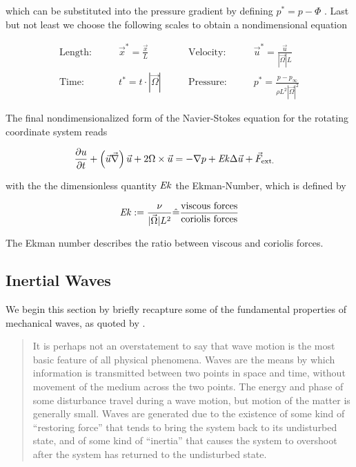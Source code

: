 which can be substituted into the pressure gradient by defining $p^* = p - \Phi$ \citep{tritton88}.
\newpage
Last but not least we choose the following scales to obtain a nondimensional equation

\begin{align}
    \text{Length:}\qquad &  \vec{x}^* = \frac{\vec{x}}{L}  &
    \qquad \text{Velocity:}\qquad& \vec{u}^* =  \frac{\vec{u}}{|\vec{\Omega}|L}\\
    \text{Time:}  \qquad & t^* = t \cdot |\vec{\Omega}| &
    \qquad  \text{Pressure:}\qquad & p^* = \frac{p - p_\infty}{\rho L^2{|\vec{\Omega}|}^2}
\end{align}

The final nondimensionalized form of the Navier-Stokes equation for the rotating coordinate system reads

\begin{align}
    \label{theorie:rotns}
    \pdn[u]{t}+ \left(\vec{u}  \vec{\nabla}\right) \vec{u} + 2\Omega \times \vec{u}  &= -  \nabla p + \Ekman \Delta \vec{u} + \vec{F}_{\text{ext.}}
\end{align}

with the the dimensionless quantity $\mbox{\textit{Ek}}$ the Ekman-Number, which is defined by

\begin{align}
    \mbox{\textit{Ek}} := \frac{\nu}{|\vec{\Omega}| L^2} \hat{=} \frac{\text{viscous forces}}{\text{coriolis forces}}
\end{align}

The Ekman number describes the ratio between viscous and coriolis forces.

\subsection{Inertial Waves}

We begin this section by briefly recapture some of the fundamental properties of mechanical waves, as quoted by \cite[p.194]{Kundu2012}.

\begin{quote}
It is perhaps not an overstatement to say that wave motion is the most basic feature
of all physical phenomena. Waves are the means by which information is transmitted
between two points in space and time, without movement of the medium across the
two points. The energy and phase of some disturbance travel during a wave motion,
but motion of the matter is generally small. Waves are generated due to the existence of
some kind of “restoring force” that tends to bring the system back to its undisturbed
state, and of some kind of “inertia” that causes the system to overshoot after the
system has returned to the undisturbed state.
\end{quote}


